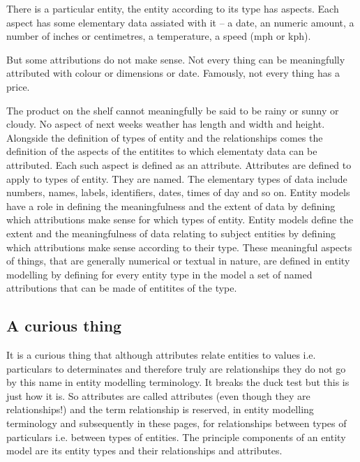 \mynote There is a particular entity, the entity according to its type has aspects.
Each aspect has some elementary data assiated with it -- a date, an numeric amount, a number of inches or centimetres, a temperature, a speed (mph or kph). 

\mynote
But some attributions do not make sense. Not every thing can be meaningfully attributed with colour or dimensions or date. 
Famously, not every thing has a price. 

\mynote
The product on the shelf cannot meaningfully be said to be rainy or sunny or cloudy.
No aspect of next weeks weather has length and width and height. 
\mynote 
Alongside the definition of types of entity and the relationships 
comes the definition of the aspects of the entitites to which elementaty data
can be attributed. Each such aspect is defined as an attribute. Attributes are defined to apply to types of entity. They are named.  
The elementary types of data include numbers, names, labels, identifiers, dates, times of day and so on.   
\mynote 
Entity models have a role in defining the meaningfulness and the extent of data
 by defining which attributions make sense for which types of entity.
\mynote 
Entity models define the extent and the meaningfulness of data relating to subject entities by defining which attributions make sense according to their type.
\mynote
These meaningful aspects of things, that are generally numerical or textual in nature, 
are defined in entity modelling by defining for every entity type in the  model 
 a set of named attributions that can be made of entitites of the type. 





\subsection{A curious thing}
\mynote
It is a curious thing that although attributes relate entities to values
i.e. particulars to determinates and therefore truly are relationships they do not
go by this name in entity modelling terminology. It breaks the duck test but
this is just how it is.
So attributes are called attributes (even though they
are relationships!) and the term relationship is reserved, in entity modelling
terminology and subsequently in these pages, for relationships between types of
particulars i.e. between types of entities. The principle components of an entity
model are its entity types and their relationships and attributes.


